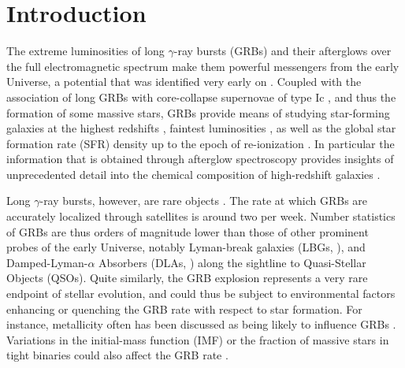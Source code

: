 \documentclass[traditabstract, longauth]{aa}
\begin{document}
\section{Introduction}

The extreme luminosities of long $\gamma$-ray bursts (GRBs) and their afterglows \citep[e.g.,][for recent reviews]{2009ARA&A..47..567G, 2014arXiv1410.0679K} over the full electromagnetic spectrum make them powerful messengers from the early Universe, a potential that was identified very early on \citep[e.g.,][]{1998MNRAS.294L..13W, 2000ApJ...536....1L}. Coupled with the association of long GRBs with core-collapse supernovae of type Ic \citep[e.g.,][]{1998Natur.395..670G, 2003Natur.423..847H, 2006Natur.442.1011P}, and thus the formation of some massive stars, GRBs provide means of studying star-forming galaxies at the highest redshifts \citep[e.g.,][]{2007ApJ...671..272C, 2009ApJ...691..152C, 2012ApJ...754...46T}, faintest luminosities \citep[e.g.,][]{2001ApJ...546..672V, 2012ApJ...749L..38T}, as well as the global star formation rate (SFR) density up to the epoch of re-ionization \citep[e.g.,][]{2009ApJ...705L.104K, 2012ApJ...744...95R, 2012A&A...539A.113E}. In particular the information that is obtained through afterglow spectroscopy provides insights of unprecedented detail into the chemical composition of high-redshift galaxies \citep[e.g.,][]{2006A&A...451L..47F, 2009ApJ...691L..27P, 2013MNRAS.428.3590T, 2015ApJ...804...51C}.

Long $\gamma$-ray bursts, however, are rare objects \citep[e.g.,][]{2004ApJ...607L..17P, 2007ApJ...657L..73G}. The rate at which GRBs are accurately localized through satellites is around two per week. Number statistics of GRBs are thus orders of magnitude lower than those of other prominent probes of the early Universe, notably Lyman-break galaxies (LBGs, \citealp[e.g.,][]{1996ApJ...462L..17S}), and Damped-Lyman-$\alpha$ Absorbers (DLAs, \citealp[e.g.,][]{2005ARA&A..43..861W}) along the sightline to Quasi-Stellar Objects (QSOs). Quite similarly, the GRB explosion represents a very rare endpoint of stellar evolution, and could thus be subject to environmental factors enhancing or quenching the GRB rate with respect to star formation. For instance, metallicity often has been discussed as being likely to influence GRBs \citep[e.g.,][]{2006AcA....56..333S, 2008AJ....135.1136M}. Variations in the initial-mass function (IMF) or the fraction of massive stars in tight binaries could also affect the GRB rate \citep[][]{2014ApJ...789...23K}.
\end{document}
